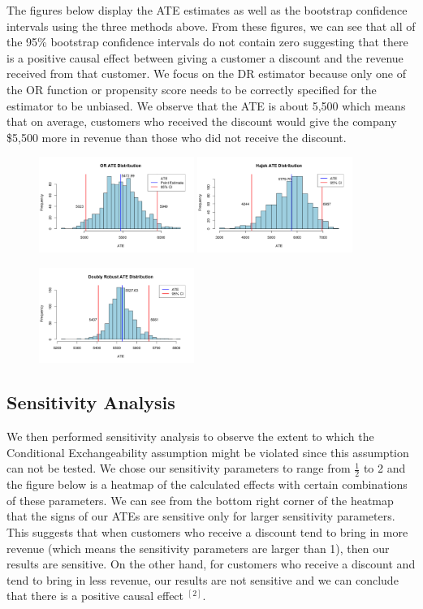 \documentclass{article}
\begin{document}
The figures below display the ATE estimates as well as the bootstrap confidence intervals using the three methods above. From these figures, we can see that all of the 95\% bootstrap confidence intervals do not contain zero suggesting that there is a positive causal effect between giving a customer a discount and the revenue received from that customer. We focus on the DR estimator because only one of the OR function or propensity score needs to be correctly specified for the estimator to be unbiased. We observe that the ATE is about 5,500 which means that on average, customers who received the discount would give the company \$5,500 more in revenue than those who did not receive the discount.
\begin{figure}[H]
  \includegraphics[width = 0.45\textwidth]{figs/or.png}
  \includegraphics[width = 0.45\textwidth]{figs/hajek.png}
\end{figure}
\begin{figure}[H]
  \centering
  \includegraphics[width = 0.45\textwidth]{figs/dr.png}
\end{figure}
\subsection{Sensitivity Analysis}
We then performed sensitivity analysis to observe the extent to which the Conditional Exchangeability assumption might be violated since this assumption can not be tested. We chose our sensitivity parameters to range from $\frac{1}{2}$ to 2 and the figure below is a heatmap of the calculated effects with certain combinations of these parameters. We can see from the bottom right corner of the heatmap that the signs of our ATEs are sensitive only for larger sensitivity parameters. This suggests that when customers who receive a discount tend to bring in more revenue (which means the sensitivity parameters are larger than 1), then our results are sensitive. On the other hand, for customers who receive a discount and tend to bring in less revenue, our results are not sensitive and we can conclude that there is a positive causal effect $^{[2]}$.
\end{document}
